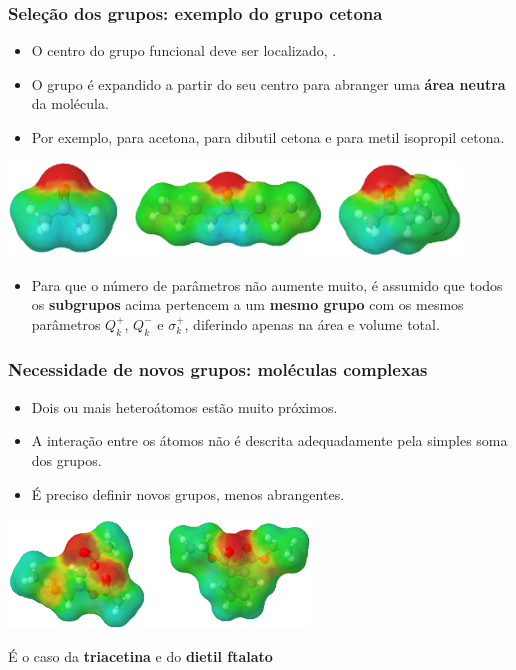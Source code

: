 \documentclass[aspectratio=169]{beamer}
\begin{document}
\begin{frame}[plain]
  \frametitle{Seleção dos grupos: exemplo do grupo cetona}
  \begin{itemize}
    \item O centro do grupo funcional deve ser localizado, .
    \item O grupo é expandido a partir do seu centro para abranger uma
    \textbf{área neutra} da molécula.
    \item Por exemplo,  para acetona,  para dibutil
    cetona e  para metil isopropil cetona.
  \end{itemize}
  \begin{center}
  \includegraphics[width=0.9\textwidth]{img/cetona}
  \end{center}
  \begin{itemize} \pause
  \item Para que o número de parâmetros não aumente muito,
  	é assumido que todos os \textbf{subgrupos} acima pertencem a um \textbf{mesmo grupo}
  	com os mesmos parâmetros $Q_k^+$, $Q_k^-$ e $\sigma_k^+$, diferindo apenas na área
  	e volume total.
  \end{itemize}
\end{frame}

\begin{frame}
  \frametitle{Necessidade de novos grupos: moléculas complexas}
  \begin{itemize}
    \item Dois ou mais heteroátomos estão muito próximos.
    \item A interação entre os átomos não é descrita adequadamente pela simples
    soma dos grupos.
    \item É preciso definir novos grupos, menos abrangentes.
  \end{itemize}
  \begin{center}
  \includegraphics[width=0.6\textwidth]{img/ester_1}
  \end{center}
  \begin{footnotesize}
  É o caso da \textbf{triacetina} e do \textbf{dietil ftalato}
  \end{footnotesize}
\end{frame}
\end{document}
